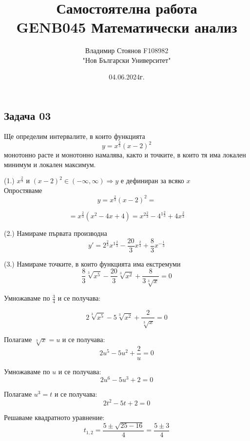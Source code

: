 \documentclass{article}
\title{\huge Самостоятелна работа \\ GENB045 Математически анализ}
\author{\LARGE Владимир Стоянов F108982 \\ \LARGE "Нов Български Университет"}
\date{\LARGE 04.06.2024г.}
\begin{document}
\maketitle

\Large
\begin{center}
    \section*{Задача 03}
\end{center}
\newpage
\begin{center}
    Ще определим интервалите, в които функцията \[ y = x^\frac{2}{3}(x-2)^2 \] монотонно расте и монотонно намалява, както и точките, в които тя има локален минимум и локален максимум.
\end{center}
\vspace{0.5cm}
(1.) $x^\frac{2}{3} $ и $ (x-2)^2 \in (-\infty, \infty) \Rightarrow y $ е дефиниран \linebreak за всяко $ x $
\vspace{0.5cm} \\
Опростяваме
\[ y = x^\frac{2}{3}(x-2)^2 = \]

\[ = x^\frac{2}{3}(x^2-4x+4) = x^{2\frac{2}{3}} - 4^{1\frac{2}{3}} + 4x^\frac{2}{3} \]

\vspace{0.5cm}
(2.) Намираме първата производна
\[ y' = 2^\frac{2}{3}x^{1\frac{2}{3}} - \frac{20}{3}x^\frac{2}{3} + \frac{8}{3}x^{-\frac{1}{3}} \]

\vspace{0.5cm}
(3.) Намираме точките, в които функцията има \linebreak екстремуми
\[ \frac{8}{3}\sqrt[3]{x^5} - \frac{20}{3}\sqrt[3]{x^2} + \frac{8}{3\sqrt[3]{x}} = 0 \]

\vspace{0.5cm}
Умножаваме по $ \frac{3}{4} $ и се получава:

\[ 2\sqrt[3]{x^5} - 5\sqrt[3]{x^2} + \frac{2}{\sqrt[3]{x}} = 0 \]

\newpage
Полагаме $ \sqrt[3]{x} = u $ и се получава:
\[ 2u^5 - 5u^2 + \frac{2}{u} = 0 \]

\vspace{0.5cm}
Умножаваме по $ u $ и се получава:
\[ 2u^6 - 5u^3 + 2 = 0 \]

\vspace{0.5cm}
Полагаме $ u^3 = t $ и се получава:
\[ 2t^2-5t+2 = 0 \]

\vspace{0.5cm}
Решаваме квадратното уравнение:
\[ t_{1,2} = \frac{5 \pm \sqrt{25-16}}{4} = \frac{5 \pm 3}{4} \]
\end{document}
